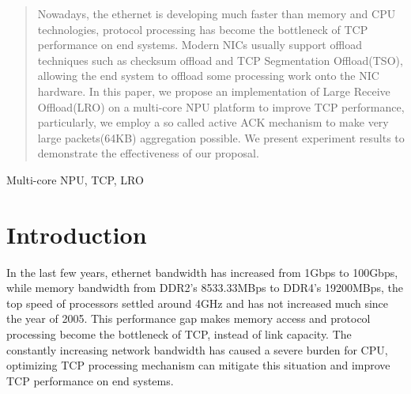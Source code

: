 \documentclass[conference]{IEEEtran}
\begin{document}




\maketitle

\begin{abstract}
Nowadays, the ethernet is developing much faster than memory and CPU technologies, protocol processing has become the bottleneck of TCP performance on end systems. Modern NICs usually support offload techniques such as checksum offload and TCP Segmentation Offload(TSO), allowing the end system to offload some processing work onto the NIC hardware. In this paper, we propose an implementation of Large Receive Offload(LRO) on a multi-core NPU platform to improve TCP performance, particularly, we employ a so called active ACK mechanism to make very large packets(64KB) aggregation possible. We present experiment results to demonstrate the effectiveness of our proposal.
\end{abstract}

\begin{IEEEkeywords}
Multi-core NPU, TCP, LRO
\end{IEEEkeywords}
%
\IEEEpeerreviewmaketitle



\section{Introduction}


In the last few years, ethernet bandwidth has increased from 1Gbps to 100Gbps, while memory bandwidth from DDR2's 8533.33MBps\cite{wikiddr2} to DDR4's 19200MBps\cite{wikiddr4}, the top speed of processors settled around 4GHz and has not increased much since the year of 2005\cite{danowitz2012cpu}. This performance gap makes memory access and protocol processing become the bottleneck of TCP, instead of link capacity. The constantly increasing network bandwidth has caused a severe burden for CPU, optimizing TCP processing mechanism can mitigate this situation and improve TCP performance on end systems.
\end{document}

